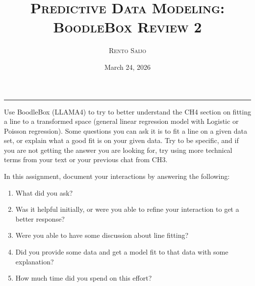 \documentclass[10pt]{extarticle}
\title{\centering\Large\textsc{\textbf{Predictive Data Modeling: BoodleBox Review 2}}}
\author{\large \textsc{Rento Saijo}}
\date{March 24, 2026}
\begin{document}
\maketitle
\thispagestyle{fancy}
\vspace{-1em}\noindent\rule{\linewidth}{0.6pt}\vspace{0.5em}

\begin{problem}[Instructions]
Use BoodleBox (LLAMA4) to try to better understand the CH4 section on fitting a line to a transformed space (general linear regression model with Logistic or Poisson regression). Some questions you can ask it is to fit a line on a given data set, or explain what a good fit is on your given data. Try to be specific, and if you are not getting the answer you are looking for, try using more technical terms from your text or your previous chat from CH3.

\medskip
In this assignment, document your interactions by answering the following:
\begin{enumerate}[label=\arabic*., leftmargin=2em]
\item What did you ask?
\item Was it helpful initially, or were you able to refine your interaction to get a better response?
\item Were you able to have some discussion about line fitting?
\item Did you provide some data and get a model fit to that data with some explanation?
\item How much time did you spend on this effort?
\end{enumerate}
\end{problem}
\end{document}
